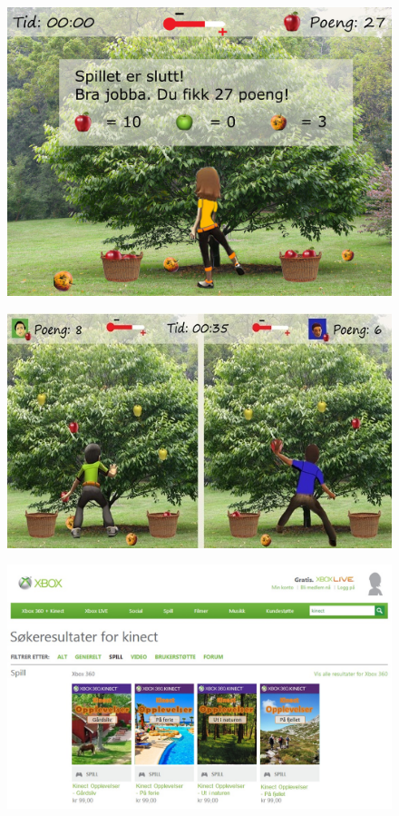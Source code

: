 \begin{figure} [H]
\centering
\includegraphics[scale=0.07]{appletreeend.jpg}
\label{fig:appleOverNorsk}
\end{figure}

\begin{figure} [H]
\centering
\includegraphics[scale=0.7]{multiplayereple.jpg}
\label{fig:appleMultiplayerNorsk}
\end{figure}

\begin{figure} [H]
\centering
\includegraphics[scale=0.5, angle=90]{SpillXboxNYNY.jpg}
\label{fig:videogameseriesHeleNorsk}
\end{figure}

